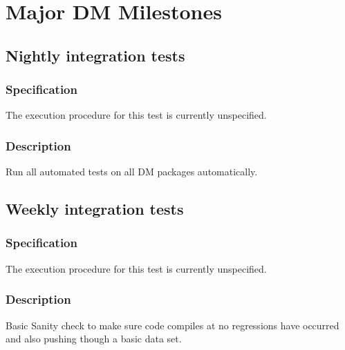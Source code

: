 










\section{Major DM Milestones \label{sect:milestones}}

\subsection{Nightly integration tests}

\subsubsection{Specification}
The execution procedure for this test is currently unspecified.
\subsubsection{Description}
Run all automated tests on all DM packages automatically.

\subsection{Weekly integration tests}

\subsubsection{Specification}
The execution procedure for this test is currently unspecified.

\subsubsection{Description}
Basic Sanity check to make sure code compiles at no regressions have occurred
and also pushing though a basic data set.




